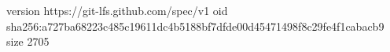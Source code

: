 version https://git-lfs.github.com/spec/v1
oid sha256:a727ba68223c485c19611dc4b5188bf7dfde00d45471498f8c29fe4f1cabacb9
size 2705
